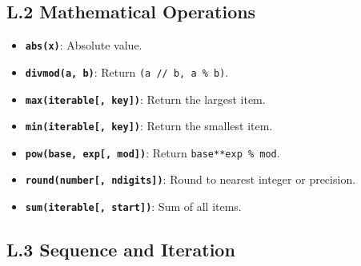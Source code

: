 \hypertarget{l.2-mathematical-operations}{%
\subsection{L.2 Mathematical
Operations}\label{l.2-mathematical-operations}}

\begin{itemize}
\tightlist
\item
  \textbf{\passthrough{\lstinline!abs(x)!}}: Absolute value.
\item
  \textbf{\passthrough{\lstinline!divmod(a, b)!}}: Return
  \passthrough{\lstinline!(a // b, a \% b)!}.
\item
  \textbf{\passthrough{\lstinline!max(iterable[, key])!}}: Return the
  largest item.
\item
  \textbf{\passthrough{\lstinline!min(iterable[, key])!}}: Return the
  smallest item.
\item
  \textbf{\passthrough{\lstinline!pow(base, exp[, mod])!}}: Return
  \passthrough{\lstinline!base**exp \% mod!}.
\item
  \textbf{\passthrough{\lstinline!round(number[, ndigits])!}}: Round to
  nearest integer or precision.
\item
  \textbf{\passthrough{\lstinline!sum(iterable[, start])!}}: Sum of all
  items.
\end{itemize}

\hypertarget{l.3-sequence-and-iteration}{%
\subsection{L.3 Sequence and
Iteration}\label{l.3-sequence-and-iteration}}


